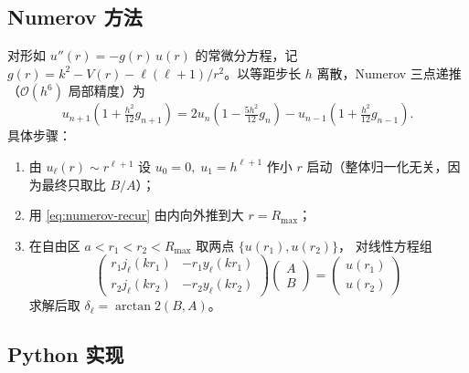 \subsection*{Numerov 方法}
对形如 $u''(r)=-g(r)\,u(r)$ 的常微分方程，记
$g(r)=k^2-V(r)-\ell(\ell+1)/r^2$。以等距步长 $h$ 离散，Numerov
三点递推（$\mathcal O(h^6)$ 局部精度）为
\begin{equation}\label{eq:numerov-recur}
  u_{n+1}\!\left(1+\tfrac{h^2}{12}g_{n+1}\right)
  =2u_n\!\left(1-\tfrac{5h^2}{12}g_n\right)
  -u_{n-1}\!\left(1+\tfrac{h^2}{12}g_{n-1}\right).
\end{equation}
具体步骤：
\begin{enumerate}
  \item 由 $u_\ell(r)\sim r^{\ell+1}$ 设 $u_0=0,\;u_1=h^{\ell+1}$
        作小 $r$ 启动（整体归一化无关，因为最终只取比 $B/A$）；
  \item 用 \eqref{eq:numerov-recur} 由内向外推到大 $r=R_{\max}$；
  \item 在自由区 $a<r_1<r_2<R_{\max}$ 取两点 $\{u(r_1),u(r_2)\}$，
        对线性方程组
        \[
          \begin{pmatrix} r_1 j_\ell(kr_1) & -r_1 y_\ell(kr_1)\\
                          r_2 j_\ell(kr_2) & -r_2 y_\ell(kr_2)
          \end{pmatrix}
          \begin{pmatrix}A\\B\end{pmatrix}
          =\begin{pmatrix}u(r_1)\\u(r_2)\end{pmatrix}
        \]
        求解后取 $\delta_\ell=\arctan2(B,A)$。
\end{enumerate}

\subsection*{Python 实现}


